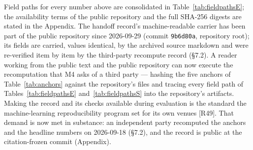 \documentclass[11pt,a4paper]{article}
\begin{document}
Field paths for every number above are consolidated in Table~\ref{tab:fieldpathsE}; the availability terms of the public repository and the full SHA-256 digests are stated in the Appendix. The handoff record's machine-readable carrier has been part of the public repository since 2026-09-29 (commit \texttt{9b6d80a}, repository root); its fields are carried, values identical, by the archived source markdown and were re-verified item by item by the third-party recompute record (§7.2). A reader working from the public text and the public repository can now execute the recomputation that M4 asks of a third party — hashing the five anchors of Table~\ref{tab:anchors} against the repository's files and tracing every field path of Tables~\ref{tab:fieldpathsE} and~\ref{tab:fieldpathsS} into the repository's artifacts. Making the record and its checks available during evaluation is the standard the machine-learning reproducibility program set for its own venues [R49]. That demand is now met in substance: an independent party recomputed the anchors and the headline numbers on 2026-09-18 (§7.2), and the record is public at the citation-frozen commit (Appendix).
\end{document}
